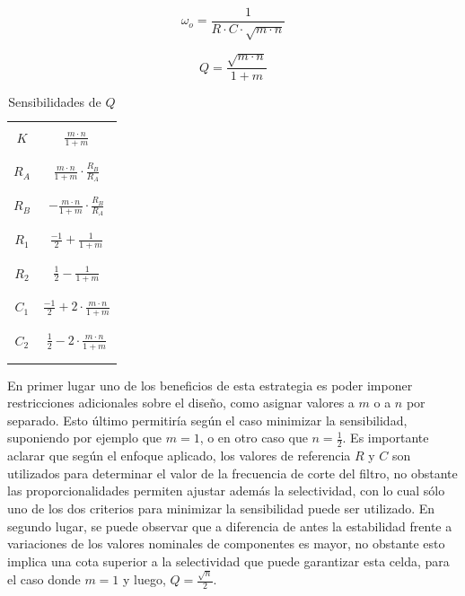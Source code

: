 \begin{equation}
    \omega_o = \frac{1}{R \cdot C \cdot \sqrt{m \cdot n}}
    \label{eq:wo_ajuste_componentes_propocionales}
\end{equation}

\begin{equation}
    Q = \frac{\sqrt{m \cdot n}}{1 + m}
    \label{eq:q_ajuste_componentes_proporcionales}
\end{equation}


\begin{table}[H]
    \centering
    \begin{tabular}{c | c}
        \hline \\
        $K$ & $\frac{m \cdot n}{1 + m}$ \\
        \\ \hline \\
        $R_A$ & $\frac{m \cdot n}{1 + m} \cdot \frac{R_B}{R_A}$ \\
        \\ \hline \\
        $R_B$ & $- \frac{m \cdot n}{1 + m} \cdot \frac{R_B}{R_A}$ \\
        \\ \hline \\
        $R_1$ & $\frac{-1}{2} + \frac{1}{1 + m}$ \\
        \\ \hline \\
        $R_2$ & $\frac{1}{2} - \frac{1}{1 + m}$ \\
        \\ \hline \\
        $C_1$ & $\frac{-1}{2} + 2 \cdot \frac{m \cdot n}{1 + m}$ \\
        \\ \hline \\
        $C_2$ & $\frac{1}{2} - 2 \cdot \frac{m \cdot n}{1 + m}$ \\
        \\ \hline \\
    \end{tabular}
    \caption{Sensibilidades de $Q$}
\end{table}

En primer lugar uno de los beneficios de esta estrategia es poder imponer restricciones adicionales sobre el dise\~no, como asignar valores a $m$ o a $n$ por separado. Esto \'ultimo permitir\'ia seg\'un
el caso minimizar la sensibilidad, suponiendo por ejemplo que $m = 1$, o en otro caso que $n = \frac{1}{2}$. Es importante aclarar que seg\'un el enfoque aplicado, los valores de referencia $R$ y $C$ son utilizados
para determinar el valor de la frecuencia de corte del filtro, no obstante las proporcionalidades permiten ajustar adem\'as la selectividad, con lo cual s\'olo uno de los dos criterios para minimizar la sensibilidad puede ser utilizado.
En segundo lugar, se puede observar que a diferencia de antes la estabilidad frente a variaciones de los valores nominales de componentes es mayor, no obstante esto implica una cota superior a la selectividad que puede garantizar esta celda,
para el caso donde $m = 1$ y luego, $Q = \frac{\sqrt{n}}{2}$.

